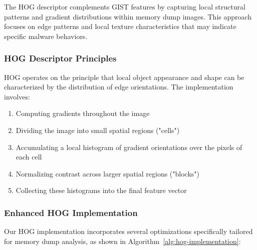The HOG descriptor complements GIST features by capturing local structural patterns and gradient distributions within memory dump images. This approach focuses on edge patterns and local texture characteristics that may indicate specific malware behaviors.

\subsubsection{HOG Descriptor Principles}

HOG operates on the principle that local object appearance and shape can be characterized by the distribution of edge orientations. The implementation involves:

\begin{enumerate}
    \item Computing gradients throughout the image
    \item Dividing the image into small spatial regions ("cells")
    \item Accumulating a local histogram of gradient orientations over the pixels of each cell
    \item Normalizing contrast across larger spatial regions ("blocks")
    \item Collecting these histograms into the final feature vector
\end{enumerate}

\subsubsection{Enhanced HOG Implementation}

Our HOG implementation incorporates several optimizations specifically tailored for memory dump analysis, as shown in Algorithm~\ref{alg:hog-implementation}:

